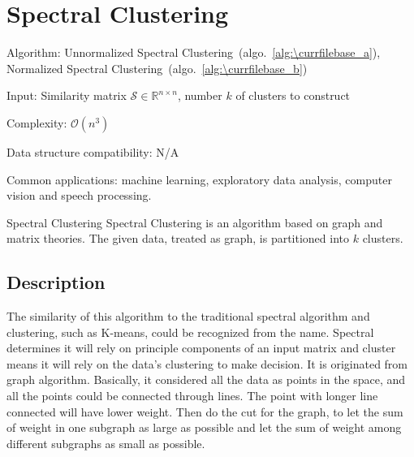 \documentclass[catalog.tex]{subfiles}
\begin{document}
\def\pbname{Spectral Clustering} %

\section{\pbname} 

\begin{overview}
\item [Algorithm:] Unnormalized Spectral Clustering~(algo.~\ref{alg:\currfilebase_a}), Normalized Spectral Clustering~(algo.~\ref{alg:\currfilebase_b})
\item [Input:] Similarity matrix $\mathcal{S} \in \mathbb{R}^{n\times n}$, number $k$ of clusters to construct 
\item [Complexity:] $\mathcal{O}(n^3)$
\item [Data structure compatibility:] N/A
\item [Common applications:] machine learning, exploratory data analysis, computer vision and speech processing.
\end{overview}


\begin{problem}{\pbname}
Spectral Clustering is an algorithm based on graph and matrix theories. The given data, treated as graph, is partitioned into $k$ clusters.  
\end{problem}


\subsection*{Description}

The similarity of this algorithm to the traditional spectral algorithm and clustering, such as K-means, could be recognized from the name. Spectral determines it will rely on principle components of an input matrix and cluster means it will rely on the data's clustering to make decision. It is originated from graph algorithm. Basically, it considered all the data as points in the space, and all the points could be connected through lines. The point with longer line connected will have lower weight. Then do the cut for the graph, to let the sum of weight in one subgraph  as large as possible and let the sum of weight among different subgraphs as small as possible. 
\end{document}
